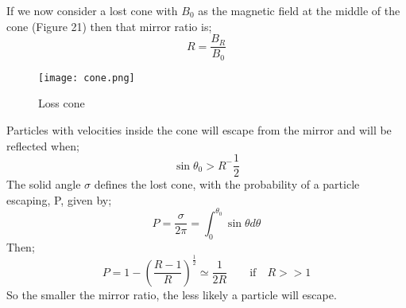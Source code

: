 \documentclass[14paper,11pt,hidelinks]{article}
\begin{document}
If we now consider a lost cone with \begin{math} B_0 \end{math} as the magnetic field at the middle of the cone (Figure 21) then that mirror ratio is;
\begin{equation} 
R=\frac{B_R}{B_0}
\end{equation}
\newline
\begin{figure}[!ht]
\centering
\texttt{[image: cone.png]} 
\caption{Loss cone}
\end{figure}
\newline
Particles with velocities inside the cone will escape from the mirror and will be reflected when;
\begin{equation}
\sin\theta_0>R^-\frac{1}{2}
\end{equation}
The solid angle \begin{math} \sigma \end{math} defines the lost cone, with the probability of a particle escaping, P, given by;
\begin{equation}
P=\frac{\sigma}{2\pi}=\int_{0}^{\theta_0}\sin\theta d\theta
\end{equation}
Then;
\begin{equation}
P=1-\left(\frac{R-1}{R}\right)^\frac{1}{2}\simeq\frac{1}{2R}\qquad \textrm{if} \quad R>>1 
\end{equation}
So the smaller the mirror ratio, the less likely a particle will escape.


\end{document}
